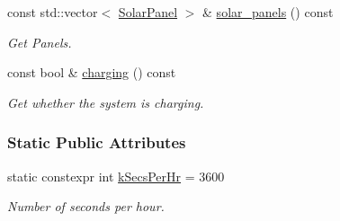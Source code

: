 \begin{DoxyCompactItemize}
const std\+::vector$<$ \hyperlink{classosse_1_1collaborate_1_1_solar_panel}{Solar\+Panel} $>$ \& \hyperlink{classosse_1_1collaborate_1_1_subsystem_power_a2167155fe0eea9b74d5603899b4b4183}{solar\+\_\+panels} () const
\begin{DoxyCompactList}\small\item\em Get Panels. \end{DoxyCompactList}\item 
const bool \& \hyperlink{classosse_1_1collaborate_1_1_subsystem_power_a21f180c076d8f5f5fd6004bc917b2571}{charging} () const
\begin{DoxyCompactList}\small\item\em Get whether the system is charging. \end{DoxyCompactList}\end{DoxyCompactItemize}
\subsubsection*{Static Public Attributes}
\begin{DoxyCompactItemize}
\item 
\mbox{\label{classosse_1_1collaborate_1_1_subsystem_power_ae707a132f821afa47c5448a4d4ff98b5}} 
static constexpr int \hyperlink{classosse_1_1collaborate_1_1_subsystem_power_ae707a132f821afa47c5448a4d4ff98b5}{k\+Secs\+Per\+Hr} = 3600
\begin{DoxyCompactList}\small\item\em Number of seconds per hour. \end{DoxyCompactList}\end{DoxyCompactItemize}
